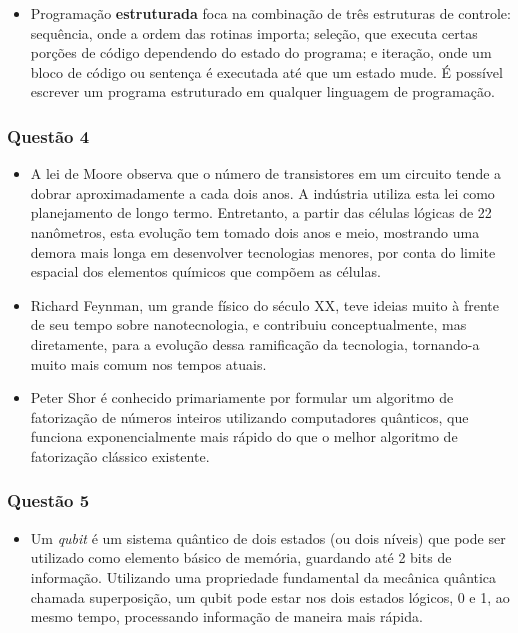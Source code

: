 \documentclass{article}
\begin{document}
\begin{itemize}
    \item Programação \textbf{estruturada} foca na combinação de três estruturas de controle: sequência, onde a ordem das rotinas importa; seleção, que executa certas porções de código dependendo do estado do programa; e iteração, onde um bloco de código ou sentença é executada até que um estado mude. É possível escrever um programa estruturado em qualquer linguagem de programação. 
\end{itemize}

\newpage

\subsubsection*{Questão 4}
\begin{itemize}
    \item A lei de Moore observa que o número de transistores em um circuito tende a dobrar aproximadamente a cada dois anos. A indústria utiliza esta lei como planejamento de longo termo. Entretanto, a partir das células lógicas de 22 nanômetros, esta evolução tem tomado dois anos e meio, mostrando uma demora mais longa em desenvolver tecnologias menores, por conta do limite espacial dos elementos químicos que compõem as células.

    \item Richard Feynman, um grande físico do século XX, teve ideias muito à frente de seu tempo sobre nanotecnologia, e contribuiu conceptualmente, mas diretamente, para a evolução dessa ramificação da tecnologia, tornando-a muito mais comum nos tempos atuais.

    \item Peter Shor é conhecido primariamente por formular um algoritmo de fatorização de números inteiros utilizando computadores quânticos, que funciona exponencialmente mais rápido do que o melhor algoritmo de fatorização clássico existente. 
\end{itemize}

\subsubsection*{Questão 5}
\begin{itemize}
    \item Um \textit{qubit} é um sistema quântico de dois estados (ou dois níveis) que pode ser utilizado como elemento básico de memória, guardando até 2 bits de informação. Utilizando uma propriedade fundamental da mecânica quântica chamada superposição, um qubit pode estar nos dois estados lógicos, 0 e 1, ao mesmo tempo, processando informação de maneira mais rápida.
\end{itemize}
\end{document}
